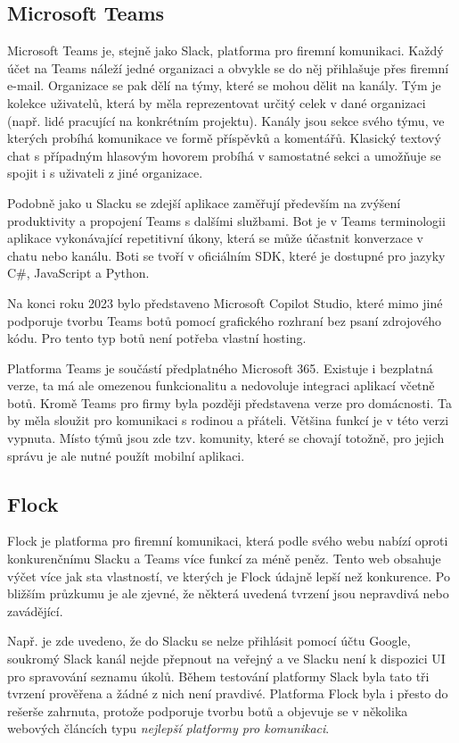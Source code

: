 \documentclass[FM]{tulthesis}
\begin{document}
	\subsection{Microsoft Teams}
	
	Microsoft Teams je, stejně jako Slack, platforma pro firemní komunikaci. Každý účet na Teams náleží jedné organizaci a obvykle se do něj přihlašuje přes firemní e-mail. Organizace se pak dělí na týmy, které se mohou dělit na kanály. Tým je kolekce uživatelů, která by měla reprezentovat určitý celek v dané organizaci (např. lidé pracující na konkrétním projektu). Kanály jsou sekce svého týmu, ve kterých probíhá komunikace ve formě příspěvků a komentářů. Klasický textový chat s případným hlasovým hovorem probíhá v samostatné sekci a umožňuje se spojit i s uživateli z jiné organizace.
	
	Podobně jako u Slacku se zdejší aplikace zaměřují především na zvýšení produktivity a propojení Teams s dalšími službami. Bot je v Teams terminologii aplikace vykonávající repetitivní úkony, která se může účastnit konverzace v chatu nebo kanálu. Boti se tvoří v oficiálním SDK, které je dostupné pro jazyky C\#, JavaScript a Python.
	
	Na konci roku 2023 bylo představeno Microsoft Copilot Studio, které mimo jiné podporuje tvorbu Teams botů pomocí grafického rozhraní bez psaní zdrojového kódu. Pro tento typ botů není potřeba vlastní hosting.
	
	Platforma Teams je součástí předplatného Microsoft 365. Existuje i bezplatná verze, ta má ale omezenou funkcionalitu a nedovoluje integraci aplikací včetně botů. Kromě Teams pro firmy byla později představena verze pro domácnosti. Ta by měla sloužit pro komunikaci s rodinou a přáteli. Většina funkcí je v této verzi vypnuta. Místo týmů jsou zde tzv. komunity, které se chovají totožně, pro jejich správu je ale nutné použít mobilní aplikaci.
	
	\subsection{Flock}
	
	Flock je platforma pro firemní komunikaci, která podle svého webu nabízí oproti konkurenčnímu Slacku a Teams více funkcí za méně peněz. Tento web obsahuje výčet více jak sta vlastností, ve kterých je Flock údajně lepší než konkurence. Po bližším průzkumu je ale zjevné, že některá uvedená tvrzení jsou nepravdivá nebo zavádějící.
	
	Např. je zde uvedeno, že do Slacku se nelze přihlásit pomocí účtu Google, soukromý Slack kanál nejde přepnout na veřejný a ve Slacku není k dispozici UI pro spravování seznamu úkolů. Během testování platformy Slack byla tato tři tvrzení prověřena a žádné z nich není pravdivé. Platforma Flock byla i přesto do rešerše zahrnuta, protože podporuje tvorbu botů a objevuje se v několika webových článcích typu \textit{nejlepší platformy pro komunikaci}.
	
\end{document}
